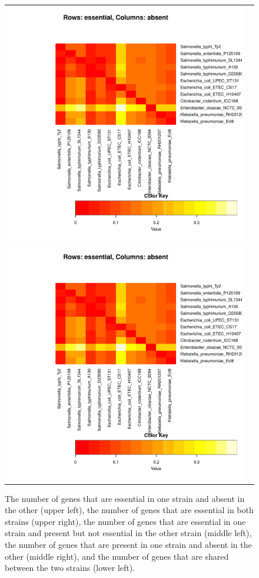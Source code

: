 \documentclass[a4paper,10pt, twocolumn]{article}
\begin{document}
\begin{figure}
\begin{tabular}{c c}
\includegraphics[page=4, scale=0.35]{essentiality-heatmap.pdf} \\
\includegraphics[page=5, scale=0.35]{essentiality-heatmap.pdf} & 
\\
\end{tabular}
\caption{The number of genes that are essential in one strain and absent in the other (upper left), the number of genes that are essential in both strains (upper right), the number of genes that are essential in one strain and present but not essential in the other strain (middle left), the number of genes that are present in one strain and absent in the other (middle right), and the number of genes that are shared between the two strains (lower left).}
\label{fig:pairwise-venn}
\end{figure}
\end{document}
